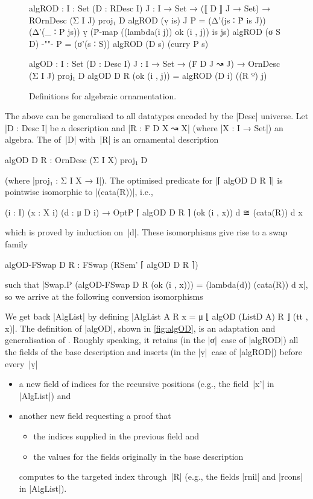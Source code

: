 \begin{figure}
\codefigure
\begin{code}
algROD :  {I : Set} (D : RDesc I) {J : I → Set} →
          (⟦ D ⟧ J → Set) → ROrnDesc (Σ I J) proj₁ D
algROD (ṿ is)   {J}     P =  (Δ'(js ∶ Ṗ is J)) (Δ'(_ ∶ P js))
                               ṿ (Ṗ-map ((lambda({i} j)) ok (i , j)) is js)
algROD (σ S D)  {-""-}  P =  (σ'(s ∶ S)) algROD (D s) (curry P s)

algOD :  {I : Set} (D : Desc I) {J : I → Set} →
         (Ḟ D J ↝ J) → OrnDesc (Σ I J) proj₁ D
algOD D R (ok (i , j)) = algROD (D i) ((R º) j)
\end{code}
\caption{Definitions for algebraic ornamentation.}
\label{fig:algOD}
\end{figure}

The above can be generalised to all datatypes encoded by the |Desc| universe.
Let |D : Desc I| be a description and |R : Ḟ D X ↝ X| (where |X : I → Set|) an algebra.
The  of~|D| with~|R| is an ornamental description
\begin{code}
algOD D R : OrnDesc (Σ I X) proj₁ D
\end{code}
(where |proj₁ : Σ I X → I|).
The optimised predicate for |⌈ algOD D R ⌉| is pointwise isomorphic to |(cata(R))|, i.e.,
\begin{code}
(i : I) (x : X i) (d : μ D i) → OptP ⌈ algOD D R ⌉ (ok (i , x)) d ≅ (cata(R)) d x
\end{code}
which is proved by induction on~|d|.
These isomorphisms give rise to a swap family
\begin{code}
algOD-FSwap D R : FSwap (RSem' ⌈ algOD D R ⌉)
\end{code}
such that |Swap.P (algOD-FSwap D R (ok (i , x))) = (lambda(d)) (cata(R)) d x|, so we arrive at the following conversion isomorphisms
We get back |AlgList| by defining |AlgList A R x = μ ⌊ algOD (ListD A) R ⌋ (tt , x)|.
The definition of |algOD|, shown in \autoref{fig:algOD}, is an adaptation and generalisation of .
Roughly speaking, it retains (in the |σ|~case of |algROD|) all the fields of the base description and inserts (in the |ṿ|~case of |algROD|) before every~|ṿ|
\begin{itemize}
\item a new field of indices for the recursive positions (e.g., the field~|x'| in |AlgList|) and
\item another new field requesting a proof that
\begin{itemize}
\item the indices supplied in the previous field and 
\item the values for the fields originally in the base description
\end{itemize}
computes to the targeted index through~|R| (e.g., the fields |rnil| and |rcons| in |AlgList|).
\end{itemize}

